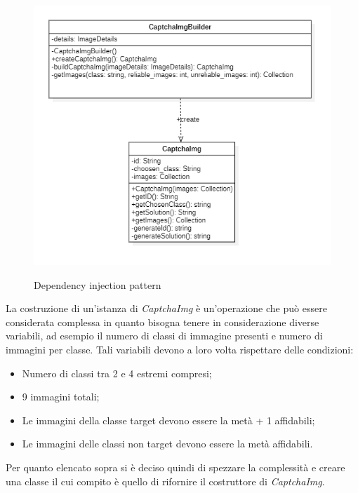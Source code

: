 \begin{figure}[H]
    \centering
    \includegraphics[scale = 0.8]{img/dependency_injection.png}\\
    \caption{Dependency injection pattern}
\end{figure}

La costruzione di un'istanza di \textit{CaptchaImg} è un'operazione che può essere considerata complessa in quanto bisogna tenere in considerazione diverse variabili, ad esempio il numero di classi di immagine presenti e numero di immagini per classe.
Tali variabili devono a loro volta rispettare delle condizioni:
\begin{itemize}
    \item Numero di classi tra 2 e 4 estremi compresi;
    \item 9 immagini totali;
    \item Le immagini della classe target devono essere la metà + 1 affidabili;
    \item Le immagini delle classi non target devono essere la metà affidabili.
\end{itemize}
Per quanto elencato sopra si è deciso quindi di spezzare la complessità e creare una classe il cui compito è quello di rifornire il costruttore di \textit{CaptchaImg}. 

